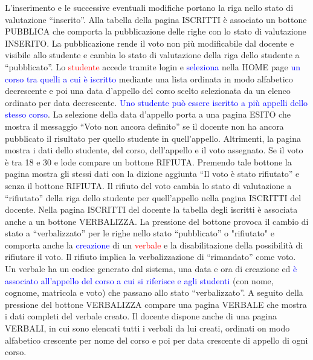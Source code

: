 \documentclass[a4paper,12pt]{scrreprt}
\begin{document}
L’inserimento e le successive eventuali modifiche portano la riga nello stato di valutazione “inserito”. Alla tabella
della pagina ISCRITTI è associato un bottone PUBBLICA che comporta la pubblicazione delle righe con lo stato di
valutazione INSERITO. La pubblicazione rende il voto non più modificabile dal docente e visibile allo studente e
cambia lo stato di valutazione della riga dello studente a “pubblicato”. Lo \textcolor{red}{studente} accede tramite login e \textcolor{blue}{seleziona}
nella HOME page \textcolor{blue}{un corso tra quelli a cui è iscritto} mediante una lista ordinata in modo alfabetico decrescente e
poi una data d’appello del corso scelto selezionata da un elenco ordinato per data decrescente. \textcolor{blue}{Uno studente può
essere iscritto a più appelli dello stesso corso}. La selezione della data d’appello porta a una pagina ESITO che mostra
il messaggio “Voto non ancora definito” se il docente non ha ancora pubblicato il risultato per quello studente in
quell’appello. Altrimenti, la pagina mostra i dati dello studente, del corso, dell’appello e il voto assegnato. Se il voto
è tra 18 e 30 e lode compare un bottone RIFIUTA. Premendo tale bottone la pagina mostra gli stessi dati con la
dizione aggiunta “Il voto è stato rifiutato” e senza il bottone RIFIUTA. Il rifiuto del voto cambia lo stato di valutazione
a “rifiutato” della riga dello studente per quell’appello nella pagina ISCRITTI del docente. Nella pagina ISCRITTI del
docente la tabella degli iscritti è associata anche a un bottone VERBALIZZA. La pressione del bottone provoca il
cambio di stato a “verbalizzato” per le righe nello stato “pubblicato” o "rifiutato" e comporta anche la \textcolor{blue}{creazione} di
un \textcolor{red}{verbale} e la disabilitazione della possibilità di rifiutare il voto. Il rifiuto implica la verbalizzazione di “rimandato”
come voto. Un verbale ha \textcolor{green!60!black}{un codice generato dal sistema, una data e ora di creazione} ed \textcolor{blue}{è associato all’appello del
corso a cui si riferisce e agli studenti} (con nome, cognome, matricola e voto) che passano allo stato “verbalizzato”.
A seguito della pressione del bottone VERBALIZZA compare una pagina VERBALE che mostra i dati completi del
verbale creato. Il docente dispone anche di una pagina VERBALI, in cui sono elencati tutti i verbali da lui creati,
ordinati on modo alfabetico crescente per nome del corso e poi per data crescente di appello di ogni corso.
\end{document}
